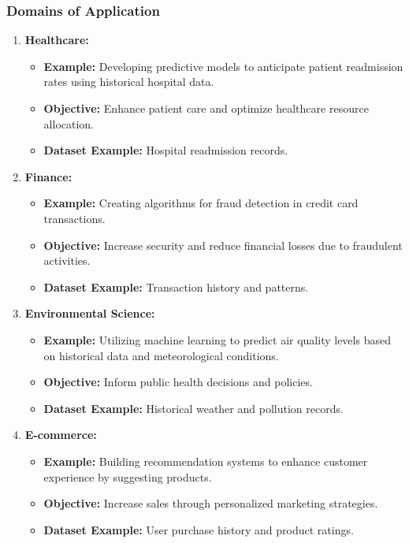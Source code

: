 \documentclass[aspectratio=169]{beamer}
\begin{document}
\begin{frame}[fragile]
    \frametitle{Domains of Application}
    \begin{enumerate}
        \item \textbf{Healthcare:}
        \begin{itemize}
            \item \textbf{Example:} Developing predictive models to anticipate patient readmission rates using historical hospital data.
            \item \textbf{Objective:} Enhance patient care and optimize healthcare resource allocation.
            \item \textbf{Dataset Example:} Hospital readmission records.
        \end{itemize}

        \item \textbf{Finance:}
        \begin{itemize}
            \item \textbf{Example:} Creating algorithms for fraud detection in credit card transactions.
            \item \textbf{Objective:} Increase security and reduce financial losses due to fraudulent activities.
            \item \textbf{Dataset Example:} Transaction history and patterns.
        \end{itemize}

        \item \textbf{Environmental Science:}
        \begin{itemize}
            \item \textbf{Example:} Utilizing machine learning to predict air quality levels based on historical data and meteorological conditions.
            \item \textbf{Objective:} Inform public health decisions and policies.
            \item \textbf{Dataset Example:} Historical weather and pollution records.
        \end{itemize}

        \item \textbf{E-commerce:}
        \begin{itemize}
            \item \textbf{Example:} Building recommendation systems to enhance customer experience by suggesting products.
            \item \textbf{Objective:} Increase sales through personalized marketing strategies.
            \item \textbf{Dataset Example:} User purchase history and product ratings.
        \end{itemize}
    \end{enumerate}
\end{frame}
\end{document}
